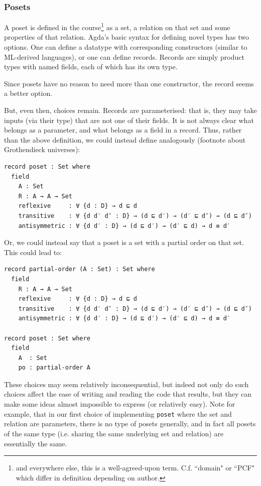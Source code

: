 \documentclass[12pt,a4paper,twoside,openright]{report}
\begin{document}
\subsubsection{Posets}
A poset is defined in the course\footnote{and everywhere else, this is a well-agreed-upon term. C.f. ``domain" or ``PCF" which differ in definition depending on author.} as a set, a relation on that set and some properties of that relation. Agda's basic syntax for defining novel types has two options. One can define a datatype with corresponding constructors (similar to ML-derived languages), or one can define records. Records are simply product types with named fields, each of which has its own type. 

Since posets have no reason to need more than one constructor, the record seems a better option. 

But, even then, choices remain. Records are parameterised: that is, they may take inputs (via their type) that are not one of their fields. It is not always clear what belongs as a parameter, and what belongs as a field in a record. Thus, rather than the above definition, we could instead define analogously (footnote about Grothendieck universes):
\begin{verbatim}
record poset : Set where
  field
    A : Set
    R : A → A → Set
    reflexive     : ∀ {d : D} → d ⊑ d 
    transitive    : ∀ {d d′ d″ : D} → (d ⊑ d′) → (d′ ⊑ d″) → (d ⊑ d″)
    antisymmetric : ∀ {d d′ : D} → (d ⊑ d′) → (d′ ⊑ d) → d ≡ d′
\end{verbatim}

Or, we could instead say that a poset is a set with a partial order on that set. This could lead to:
\begin{verbatim}
record partial-order (A : Set) : Set where
  field
    R : A → A → Set
    reflexive     : ∀ {d : D} → d ⊑ d 
    transitive    : ∀ {d d′ d″ : D} → (d ⊑ d′) → (d′ ⊑ d″) → (d ⊑ d″)
    antisymmetric : ∀ {d d′ : D} → (d ⊑ d′) → (d′ ⊑ d) → d ≡ d′

record poset : Set where
  field
    A  : Set
    po : partial-order A
\end{verbatim}

These choices may seem relatively inconsequential, but indeed not only do such choices affect the ease of writing and reading the code that results, but they can make some ideas almost impossible to express (or relatively easy). Note for example, that in our first choice of implementing \texttt{poset} where the set and relation are parameters, there is no type of posets generally, and in fact all posets of the same type (i.e. sharing the same underlying set and relation) are essentially the same. 
\end{document}
